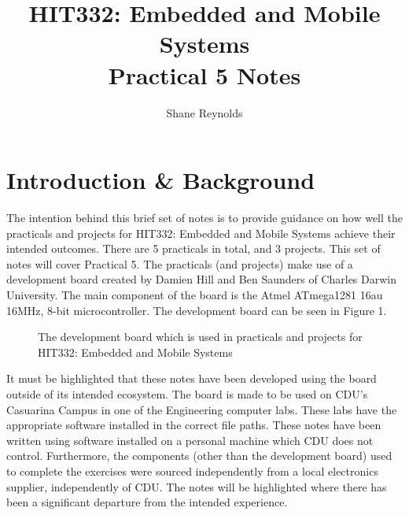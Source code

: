 \documentclass[a4paper]{article}
\begin{document}
\title{HIT332: Embedded and Mobile Systems\\ Practical 5 Notes}
\author{Shane Reynolds}
\maketitle

\tableofcontents

\section{Introduction \& Background}
The intention behind this brief set of notes is to provide guidance on how well the practicals and projects for HIT332: Embedded and Mobile Systems achieve their intended outcomes. There are 5 practicals in total, and 3 projects. This set of notes will cover Practical 5. The practicals (and projects) make use of a development board created by Damien Hill and Ben Saunders of Charles Darwin University. The main component of the board is the Atmel ATmega1281 16au 16MHz, 8-bit microcontroller. The development board can be seen in Figure 1.

\begin{figure}[h]
	\centering
	\caption{The development board which is used in practicals and projects for HIT332: Embedded and Mobile Systems}
\end{figure}

It must be highlighted that these notes have been developed using the board outside of its intended ecosystem. The board is made to be used on CDU's Casuarina Campus in one of the Engineering computer labs. These labs have the appropriate software installed in the correct file paths. These notes have been written using software installed on a personal machine which CDU does not control. Furthermore, the components (other than the development board) used to complete the exercises were sourced independently from a local electronics supplier, independently of CDU. The notes will be highlighted where there has been a significant departure from the intended experience.
\end{document}

